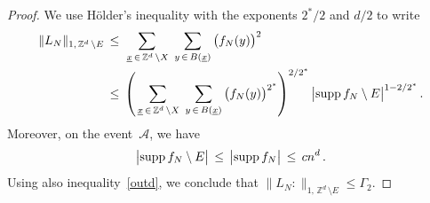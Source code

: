 \documentclass[10pt]{amsart}
\theoremstyle{definition}\newtheorem{defi}[theo]{Definition}\newtheorem{rema}[theo]{Remark}\newtheorem{exam}[theo]{Example}\newtheorem{exem}[theo]{Example}\newtheorem{nota}[theo]{Notation}
\newcommand{\xx}{{\underline{x}}}
\newcommand*\supp{\text{supp\,}}
\newcommand*\Zd {{\mathbb Z^d}}
\newcommand{\cA}{\mathcal{A}}
\begin{document}
\begin{proof}
We use H\"older's inequality with the exponents $2^*/2$ and $d/2$ to write
\begin{align*}
\|L_N\|_{1,\,\Zd\,\setminus E}
\,&\leq\,
\sum_{\,\xx\,\in
\,\Zd\,\setminus X}\;
\sum_{y\,\in\,B(\xx)}
\big(f_N(y)\big)^{2}
\\
&\leq\,
\left(\sum_{\,\xx\,\in
\,\Zd\,\setminus X}\;
\sum_{y\,\in\,B(\xx)}
\big(f_N(y)\big)^{2^*}\right)^{2/2^*}
\big|
\supp f_N
\setminus E
\big|^{1-2/2^*}\,.
\end{align*}
Moreover, on the event~$\cA$, we have
\[
\big|
\supp f_N
\setminus E
\big|\,\leq\,
\big|
\supp f_N
\big|\,\leq\,cn^d\,.
\]
Using also inequality~\eqref{outd}, we conclude that $\|L_N:\|_{1,\,\Zd\,\setminus E}\leq\Gamma_2$.
\end{proof}


\end{document}
